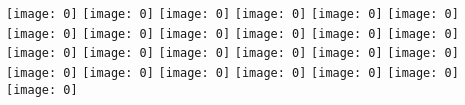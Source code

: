 \texttt{[image: 0]}
\texttt{[image: 0]}
\texttt{[image: 0]}
\texttt{[image: 0]}
\texttt{[image: 0]}
\texttt{[image: 0]}
\texttt{[image: 0]}
\texttt{[image: 0]}
\texttt{[image: 0]}
\texttt{[image: 0]}
\texttt{[image: 0]}
\texttt{[image: 0]}
\texttt{[image: 0]}
\texttt{[image: 0]}
\texttt{[image: 0]}
\texttt{[image: 0]}
\texttt{[image: 0]}
\texttt{[image: 0]}
\texttt{[image: 0]}
\texttt{[image: 0]}
\texttt{[image: 0]}
\texttt{[image: 0]}
\texttt{[image: 0]}
\texttt{[image: 0]}
\texttt{[image: 0]}
